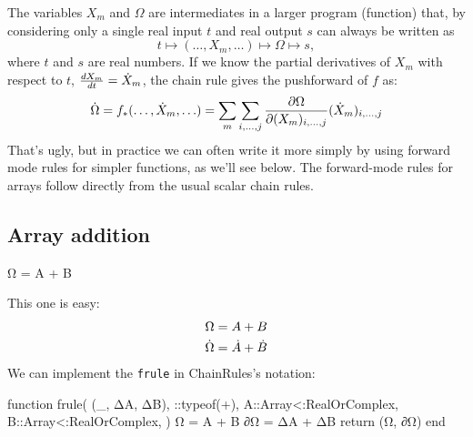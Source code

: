 \documentclass[../main.tex]{subfiles}
\begin{document}
\begin{refsection}
The variables $X_m$ and $\Omega$ are intermediates in a larger program (function) that, by considering only a single real input $t$ and real output $s$ can always be written as
\[t \mapsto (\ldots, X_m, \ldots) \mapsto \Omega \mapsto s,\]
where $t$ and $s$ are real numbers.
If we know the partial derivatives of $X_m$ with respect to $t$, $\frac{dX_m}{dt} = \dot{X}_m$, the chain rule gives the pushforward of $f$ as:
\begin{equation} \label{pf}
\dot{\Omega}
    = f_*(\ldots, \dot{X}_m, \ldots)
    = \sum_m \sum_{i, \ldots, j}
        \frac{\partial \Omega}{ \partial (X_m)_{i,\ldots,j} } (\dot{X}_m)_{i,\ldots,j}
\end{equation}
That's ugly, but in practice we can often write it more simply by using forward mode rules for simpler functions, as we'll see below.
The forward-mode rules for arrays follow directly from the usual scalar chain rules.

\subsection{Array addition}\label{array-addition}
\begin{juliacode}
Ω = A + B
\end{juliacode}
This one is easy:
\begin{align*}
\Omega &= A + B\\
\dot{\Omega} &= \dot{A} + \dot{B}
\end{align*}
We can implement the \texttt{frule} in ChainRules's notation:
\begin{juliacode}
function frule(
    (_, ΔA, ΔB),
    ::typeof(+),
    A::Array{<:RealOrComplex},
    B::Array{<:RealOrComplex},
)
    Ω = A + B
    ∂Ω = ΔA + ΔB
    return (Ω, ∂Ω)
end
\end{juliacode}

\end{refsection}
\end{document}

